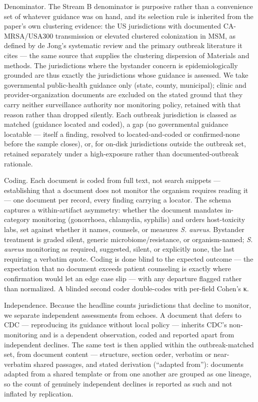\documentclass[10pt,letterpaper]{article}
\begin{document}
Denominator. The Stream B denominator is purposive rather than
a convenience set of whatever guidance was on hand, and its selection
rule is inherited from the paper's own clustering evidence: the US
jurisdictions with documented CA-MRSA/USA300 transmission or elevated
clustered colonization in MSM, as defined by de Jong's systematic review
and the primary outbreak literature it cites
\cite{dejong2025, diep2008} --- the same source that supplies the
clustering dispersion of Materials and methods. The jurisdictions where
the bystander concern is epidemiologically grounded are thus exactly the
jurisdictions whose guidance is assessed. We take governmental
public-health guidance only (state, county, municipal); clinic and
provider-organization documents are excluded on the stated ground that
they carry neither surveillance authority nor monitoring policy,
retained with that reason rather than dropped silently. Each outbreak
jurisdiction is classed as matched (guidance located and coded),
a gap (no governmental guidance locatable --- itself a finding,
resolved to located-and-coded or confirmed-none before the sample
closes), or, for on-disk jurisdictions outside the outbreak set,
retained separately under a high-exposure rather than
documented-outbreak rationale.

Coding. Each document is coded from full text, not search
snippets --- establishing that a document does not monitor the organism
requires reading it --- one document per record, every finding carrying
a locator. The schema captures a within-artifact asymmetry: whether the
document mandates in-category monitoring (gonorrhoea, chlamydia,
syphilis) and orders host-toxicity labs, set against whether it names,
counsels, or measures \emph{S. aureus}. Bystander treatment is graded
silent, generic microbiome/resistance, or organism-named; \emph{S.
aureus} monitoring as required, suggested, silent, or explicitly none,
the last requiring a verbatim quote. Coding is done blind to the
expected outcome --- the expectation that no document exceeds patient
counseling is exactly where confirmation would let an edge case slip
--- with any departure flagged rather than normalized. A blinded second
coder double-codes with per-field Cohen's κ.

Independence. Because the headline counts jurisdictions that
decline to monitor, we separate independent assessments from echoes. A
document that defers to CDC --- reproducing its guidance without local
policy --- inherits CDC's non-monitoring and is a dependent observation,
coded and reported apart from independent declines. The same test is
then applied within the outbreak-matched set, from document
content --- structure, section order, verbatim or near-verbatim shared
passages, and stated derivation (``adapted from''): documents adapted
from a shared template or from one another are grouped as one lineage,
so the count of genuinely independent declines is reported as such and
not inflated by replication.
\end{document}
